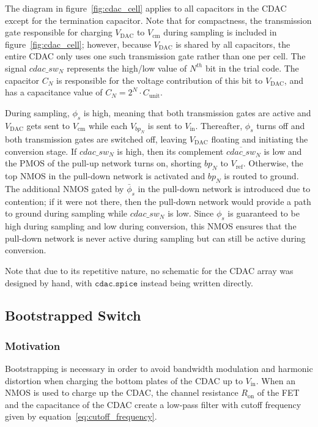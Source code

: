\documentclass[12pt, a4paper]{article}
\begin{document}
The diagram in figure~\ref{fig:cdac_cell} applies to all capacitors in the CDAC except for the termination capacitor. Note that for compactness, the transmission gate responsible for charging $V_\mathrm{DAC}$ to
$V_\mathrm{cm}$ during sampling is included in figure~\ref{fig:cdac_cell}; however, because $V_\mathrm{DAC}$ is shared by all capacitors, the entire CDAC only uses one such transmission gate rather than one per cell. 
The signal $cdac\_sw_N$ represents the high/low value of $N^{th}$ bit in the trial code. The capacitor $C_{N}$ is responsible for the voltage contribution of this bit to $V_\mathrm{DAC}$, and has a capacitance
value of $C_N = 2^N \cdot C_\mathrm{unit}$.

During sampling, $\phi_s$ is high, meaning that both transmission gates are active and $V_\mathrm{DAC}$ gets sent to $V_\mathrm{cm}$ while each $V_{bp_N}$ is sent to $V_\mathrm{in}$. 
Thereafter, $\phi_s$ turns off and both transmission gates are switched off, leaving $V_\mathrm{DAC}$ floating and initiating the conversion stage. If $cdac\_sw_N$ is high, then its complement $\overline{\mathit{cdac\_sw}}_N$ is low and the PMOS of the
pull-up network turns on, shorting $bp_N$ to $V_\mathrm{ref}$. Otherwise, the top NMOS in the pull-down network is activated and $bp_N$ is routed to ground. The additional NMOS gated by $\bar{\phi}_s$ in the pull-down
network is introduced due to contention; if it were not there, then the pull-down network would provide a path to ground during sampling while $cdac\_sw_N$ is low. Since $\phi_s$ is guaranteed to be high during sampling and low during conversion, this NMOS ensures that the pull-down network is never active during sampling but can still be active during conversion.

Note that due to its repetitive nature, no schematic for the CDAC array was designed by hand, with $\texttt{cdac.spice}$ instead being written directly.

\subsection{Bootstrapped Switch}
\label{subsection:bootstrapped_switch}

\subsubsection{Motivation}
Bootstrapping is necessary in order to avoid bandwidth modulation and harmonic distortion when charging the bottom plates of the CDAC up to $V_\mathrm{in}$. When an NMOS is used to charge up the CDAC,
the channel resistance $R_\mathrm{on}$ of the FET and the capacitance of the CDAC create a low-pass filter with cutoff frequency given by equation~\ref{eq:cutoff_frequency}.
\end{document}
